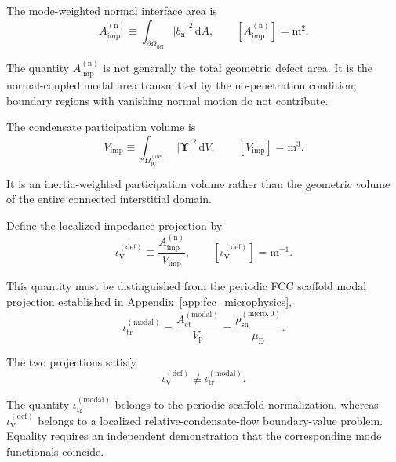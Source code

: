 The mode-weighted normal interface area is
\begin{equation}
    A_{\mathrm{imp}}^{(\mathrm{n})}
    \equiv
    \int_{\partial\Omega_{\mathrm{def}}}
    |b_{\mathrm{n}}|^2
    \,
    \mathrm{d}A,
    \qquad
    [A_{\mathrm{imp}}^{(\mathrm{n})}]
    =
    \mathrm{m}^2.
\end{equation}

The quantity $A_{\mathrm{imp}}^{(\mathrm{n})}$ is not generally the total geometric defect area. It is the normal-coupled modal area transmitted by the no-penetration condition; boundary regions with vanishing normal motion do not contribute.

The condensate participation volume is
\begin{equation}
    V_{\mathrm{imp}}
    \equiv
    \int_{\Omega_{\mathrm{IC}}^{(\mathrm{def})}}
    |\boldsymbol{\Upsilon}|^2
    \,
    \mathrm{d}V,
    \qquad
    [V_{\mathrm{imp}}]
    =
    \mathrm{m}^3.
\end{equation}

It is an inertia-weighted participation volume rather than the geometric volume of the entire connected interstitial domain.

Define the localized impedance projection by
\begin{equation}
    \label{eq:AP_defect_projection}
    \iota_{\mathrm{V}}^{(\mathrm{def})}
    \equiv
    \frac{
        A_{\mathrm{imp}}^{(\mathrm{n})}
    }{
        V_{\mathrm{imp}}
    },
    \qquad
    [\iota_{\mathrm{V}}^{(\mathrm{def})}]
    =
    \mathrm{m}^{-1}.
\end{equation}

This quantity must be distinguished from the periodic FCC scaffold modal projection established in \hyperref[app:fcc_microphysics]{Appendix~\ref*{app:fcc_microphysics}},
\begin{equation}
    \iota_{\mathrm{tr}}^{(\mathrm{modal})}
    =
    \frac{
        A_{\mathrm{ct}}^{(\mathrm{modal})}
    }{
        V_{\mathrm{p}}
    }
    =
    \frac{
        \rho_{\mathrm{sh}}^{(\mathrm{micro},0)}
    }{
        \mu_{\mathrm{D}}
    }.
\end{equation}

The two projections satisfy
\begin{equation}
    \label{eq:AP_projection_distinction}
    \iota_{\mathrm{V}}^{(\mathrm{def})}
    \not\equiv
    \iota_{\mathrm{tr}}^{(\mathrm{modal})}.
\end{equation}

The quantity $\iota_{\mathrm{tr}}^{(\mathrm{modal})}$ belongs to the periodic scaffold normalization, whereas $\iota_{\mathrm{V}}^{(\mathrm{def})}$ belongs to a localized relative-condensate-flow boundary-value problem. Equality requires an independent demonstration that the corresponding mode functionals coincide.

